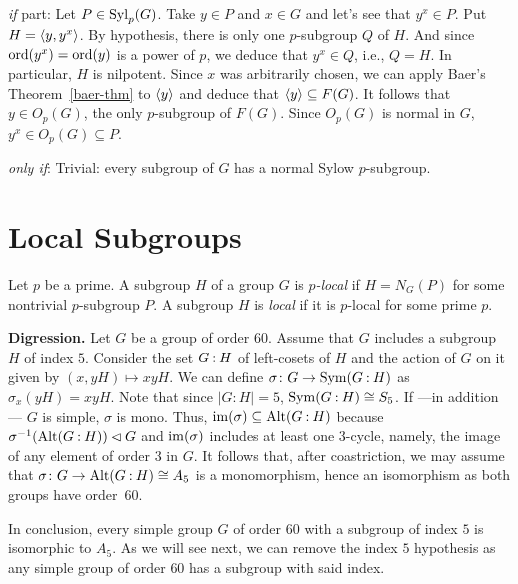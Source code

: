 \begin{solution}
\begin{description}
    \item{\normalfont\textit{if\/} part:} Let $P\in{\rm Syl}_p(G)$. Take $y\in P$ and $x\in G$ and let's see that $y^x\in P$. Put $H=\langle y,y^x\rangle$. By hypothesis, there is only one $p$-subgroup $Q$ of $H$. And since ${\rm ord}(y^x)={\rm ord}(y)$ is a power of $p$, we deduce that $y^x\in Q$, i.e., $Q=H$. In particular, $H$ is nilpotent. Since $x$ was arbitrarily chosen, we can apply Baer's Theorem~\ref{baer-thm} to $\langle y\rangle$ and deduce that $\langle y\rangle\subseteq F(G)$. It follows that $y\in O_p(G)$, the only $p$-subgroup of $F(G)$. Since $O_p(G)$ is normal in $G$, $y^x\in O_p(G)\subseteq P$.
    
    \item{\normalfont\textit{only if\/}:} Trivial: every subgroup of $G$ has a normal Sylow $p$-subgroup.
\end{description}
\end{solution}

\section{Local Subgroups}

\begin{defn}
    Let $p$ be a prime. A subgroup $H$ of a group $G$ is \textsl{$p$-local} if $H=N_G(P)$ for some nontrivial $p$-subgroup $P$. A subgroup $H$ is \textsl{local} if it is $p$-local for some prime $p$.
\end{defn}

\textbf{Digression.} Let\/ $G$ be a group of order\/ $60$. Assume that $G$ includes a subgroup\/ $H$ of index\/ $5$. Consider the set\/ $G\mathbin:H$ of left-cosets of\/ $H$ and the action of\/ $G$ on it given by\/ $(x,yH)\mapsto xyH$. We can define $\sigma\colon G\to{\rm Sym}(G\mathbin:H)$ as $\sigma_x(yH)=xyH$. Note that since $|G:H|=5$, ${\rm Sym}(G\mathbin:H)\cong S_5$. If ---in addition--- $G$ is simple, $\sigma$ is mono. Thus, $\operatorname{im}(\sigma)\subseteq{\rm Alt}(G\mathbin:H)$ because $\sigma^{-1}({\rm Alt}(G\mathbin:H))\lhd G$ and $\operatorname{im}(\sigma)$ includes at least one $3$-cycle, namely, the image of any element of order $3$ in $G$. It follows that, after coastriction, we may assume that $\sigma\colon G\to{\rm Alt}(G\mathbin:H)\cong A_5$ is a monomorphism, hence an isomorphism as both groups have order~$60$.

In conclusion, every simple group $G$ of order $60$ with a subgroup of index $5$ is isomorphic to $A_5$. As we will see next, we can remove the index $5$ hypothesis as any simple group of order $60$ has a subgroup with said index.

